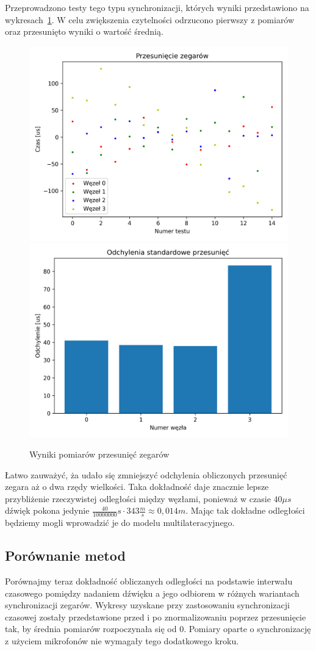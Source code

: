 Przeprowadzono testy tego typu synchronizacji, których wyniki przedstawiono na wykresach~\ref{pic:mic_sync}. W celu zwiększenia czytelności odrzucono pierwszy z pomiarów oraz przesunięto wyniki o wartość średnią.

\begin{figure}[h]
\centering
    \includegraphics[width=.49\textwidth]{pics/mic_sync/offsets.png}
    \includegraphics[width=.49\textwidth]{pics/mic_sync/stddev_offsets.png}
\caption{Wyniki pomiarów przesunięć zegarów}
\label{pic:mic_sync}
\end{figure}

Łatwo zauważyć, ża udało się zmniejszyć odchylenia obliczonych przesunięć zegara aż o dwa rzędy wielkości. Taka dokładność daje znacznie lepsze przybliżenie rzeczywistej odległości między węzłami, ponieważ w czasie $40 \mu s$ dźwięk pokona jedynie $\frac{40}{10000000}s \cdot 343 \frac{m}{s} \approx 0,014m$. Mając tak dokładne odległości będziemy mogli wprowadzić je do modelu multilateracyjnego.

\subsection{Porównanie metod}

Porównajmy teraz dokładność obliczanych odległości na podstawie interwału czasowego pomiędzy nadaniem dźwięku a jego odbiorem w różnych wariantach synchronizacji zegarów. Wykresy uzyskane przy zastosowaniu synchronizacji czasowej zostały przedstawione przed i po znormalizowaniu poprzez przesunięcie tak, by średnia pomiarów rozpoczynała się od 0. Pomiary oparte o synchronizację z użyciem mikrofonów nie wymagały tego dodatkowego kroku.

